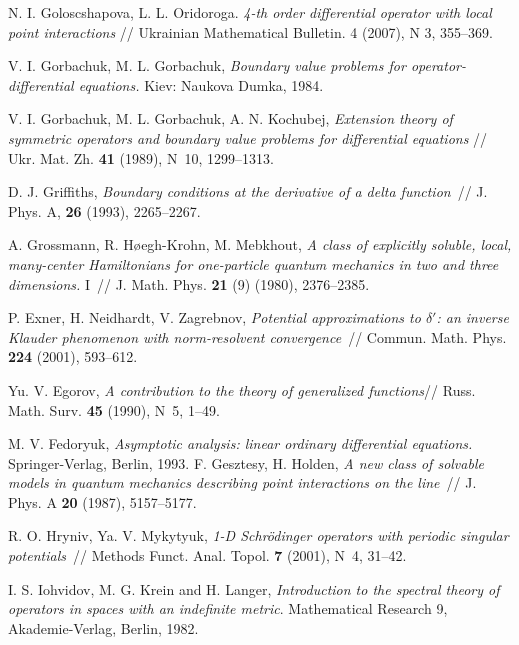 \documentclass[11pt,english]{amsart}%
\begin{document}
\begin{thebibliography}{99}
N. I. Goloscshapova, L. L. Oridoroga.\textit{ 4-th order differential operator
with local point interactions }// Ukrainian Mathematical Bulletin. 4 (2007),
N 3, 355--369.

V. I. Gorbachuk, M. L. Gorbachuk, \textit{Boundary value problems for operator-differential equations.} Kiev: Naukova Dumka, 1984.

V. I. Gorbachuk, M. L. Gorbachuk, A. N. Kochubej, \textit{
Extension theory of symmetric operators  and boundary value problems for differential equations} // Ukr. Mat. Zh. \textbf{41} (1989), N~10, 1299--1313.

D. J. Griffiths, \textit{Boundary conditions at the derivative of a delta function}~// J.
Phys. A, \textbf{26} (1993), 2265--2267.

A. Grossmann, R. H{\o}egh-Krohn,  M. Mebkhout,  \textit{A class of
explicitly soluble, local, many-center Hamiltonians for
one-particle quantum mechanics in two and three dimensions. }I~//
J. Math. Phys. \textbf{21} (9) (1980), 2376--2385.

 P. Exner, H. Neidhardt, V. Zagrebnov, \textit{Potential approximations to $\delta'$: an inverse Klauder
phenomenon with norm-resolvent convergence}~// Commun. Math. Phys. \textbf{224} (2001),
593--612.

 Yu. V. Egorov, \textit{A contribution to the theory of generalized functions}// Russ. Math. Surv. \textbf{45} (1990), N~5, 1--49.




 M. V. Fedoryuk,
\textit{Asymptotic analysis: linear ordinary differential equations.} Springer-Verlag, Berlin, 1993.
F. Gesztesy, H. Holden, \textit{A new class of solvable models in quantum mechanics
describing point interactions on the line}~// J. Phys. A \textbf{20} (1987), 5157--5177.

R. O. Hryniv, Ya. V. Mykytyuk, \textit{1-D Schr\"odinger operators with periodic singular
potentials}~// Methods Funct. Anal. Topol. \textbf{7} (2001), N~4, 31--42.

I. S. Iohvidov, M. G. Krein and H. Langer, \textit{Introduction to the spectral theory of
operators in spaces with an indefinite metric}. Mathematical Research 9, Akademie-Verlag,
Berlin, 1982.


\end{thebibliography}
\end{document}
